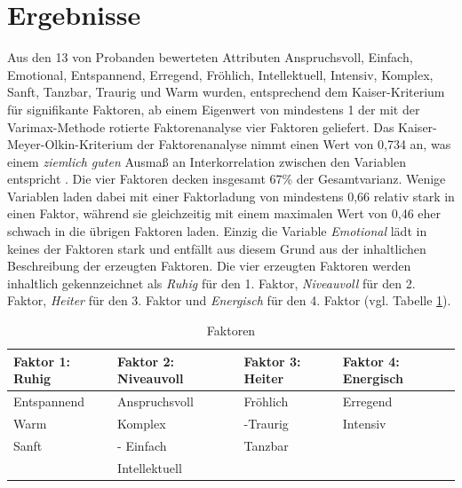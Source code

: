 \section*{Ergebnisse}
\label{sec:Ergebnisse}
Aus den 13 von Probanden bewerteten Attributen Anspruchsvoll, Einfach, Emotional, Entspannend, Erregend, Fröhlich, Intellektuell, Intensiv, Komplex, Sanft, Tanzbar, Traurig und Warm wurden, entsprechend dem Kaiser-Kriterium für signifikante Faktoren, ab einem Eigenwert von mindestens 1 der mit der Varimax-Methode rotierte Faktorenanalyse vier Faktoren geliefert.
Das Kaiser-Meyer-Olkin-Kriterium der Faktorenanalyse nimmt einen Wert von 0,734 an, was einem \textit{ziemlich guten} Ausmaß an Interkorrelation zwischen den Variablen entspricht \cite{eckey2002multivariate}.
Die vier Faktoren decken insgesamt 67\% der Gesamtvarianz.
Wenige Variablen laden dabei mit einer Faktorladung von mindestens 0,66 relativ stark in einen Faktor, während sie gleichzeitig mit einem maximalen Wert von 0,46 eher schwach in die übrigen Faktoren laden.
Einzig die Variable \textit{Emotional} lädt in keines der Faktoren stark und entfällt aus diesem Grund aus der inhaltlichen Beschreibung der erzeugten Faktoren.
Die vier erzeugten Faktoren werden inhaltlich gekennzeichnet als \textit{Ruhig} für den 1. Faktor, \textit{Niveauvoll} für den 2. Faktor, \textit{Heiter} für den 3. Faktor und \textit{Energisch} für den 4. Faktor (vgl. Tabelle \ref{tab:faktoren}).   


\begin{table}[htbp]
    \centering
    \caption{Faktoren}
    \vspace{2mm}
    \label{tab:faktoren}
        \begin{tabularx}{8cm}{|X|X|X|X|}
            \hline Faktor 1: Ruhig & Faktor 2: Niveauvoll & Faktor 3: Heiter & Faktor 4: Energisch \\
            \hline Entspan\-nend & Anspruchs\-voll       & Fröhlich             & Erregend \\
            \hline Warm              & Komplex                  & -Traurig             & Intensiv \\
            \hline Sanft               & - Einfach                 & Tanzbar             & \\
            \hline                        & Intellek\-tuell          &                          & \\
            \hline
        \end{tabularx}
\end{table}

